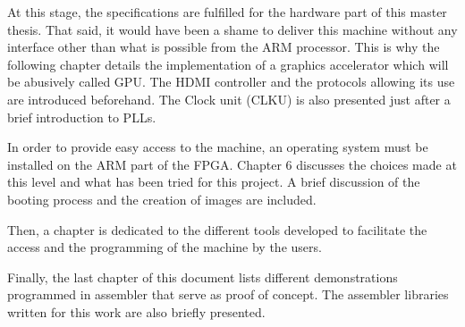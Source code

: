 At this stage, the specifications are fulfilled for the hardware part of this master thesis. That
said, it would have been a shame to deliver this machine without any interface other than what is 
possible from the ARM processor. This is why the following chapter details the implementation of a 
graphics accelerator which will be abusively called GPU. The HDMI controller and the protocols 
allowing its use are introduced beforehand. The Clock unit (CLKU) is also presented just after a 
brief introduction to PLLs.

In order to provide easy access to the machine, an operating system must be installed on the ARM 
part of the FPGA. Chapter 6 discusses the choices made at this level and what has been tried 
for this project. A brief discussion of the booting process and the creation of images are included.

Then, a chapter is dedicated to the different tools developed to facilitate the access and the 
programming of the machine by the users.

Finally, the last chapter of this document lists different demonstrations programmed in assembler
that serve as proof of concept. The assembler libraries written for this work are also briefly 
presented.